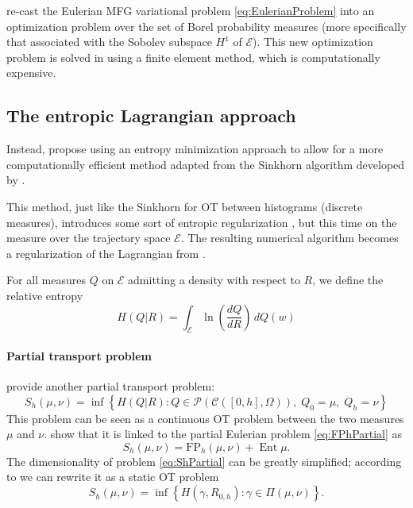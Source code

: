 \documentclass{article}
\newcommand{\calC}{\mathcal{C}}
\newcommand{\calP}{\mathcal{P}}
\DeclareMathOperator{\Ent}{Ent}
\begin{document}
    \textcite{benamou:hal-01295299,benamou2015lagrangian} re-cast the Eulerian MFG variational problem \eqref{eq:EulerianProblem} into an optimization problem over the set of Borel probability measures (more specifically that associated with the Sobolev subspace $H^1$ of $\mathscr{E}$). This new optimization problem is solved in \cite{benamou:hal-01295299} using a finite element method, which is computationally expensive.
    
    
    
    
    \subsection{The entropic Lagrangian approach}
    
    Instead, \textcite{benamou2018entropy} propose using an entropy minimization approach to allow for a more computationally efficient method adapted from the Sinkhorn algorithm \cite{cuturi2013sinkhorn} developed by \citeauthor{cuturi2013sinkhorn}.
    
    This method, just like the Sinkhorn for OT between histograms (discrete measures), introduces some sort of entropic regularization \cite{benamou2018entropy}, but this time on the measure over the trajectory space $\mathscr{E}$. The resulting numerical algorithm becomes a regularization of the Lagrangian from \cite{achdou:hal-01456506}.
    
    For all measures $Q$ on $\mathscr{E}$ admitting a density with respect to $R$, we define the relative entropy
    \begin{equation}\label{eq:VariationalEntropy}
    	H(Q | R) = \int_\mathscr{E} \ln\left(\frac{dQ}{dR}\right)\,dQ(w)
    \end{equation}
    
    \paragraph{Partial transport problem} \citeauthor{benamou2018entropy} provide another partial transport problem:
    \begin{equation}\label{eq:ShPartial}
    	S_h(\mu, \nu) =
    	\inf\left\{
    		H(Q|R) : Q\in\calP(\calC([0,h], \Omega)),
    		\; Q_0 = \mu,\; Q_h = \nu
    	\right\}
    \end{equation}
    This problem can be seen as a continuous OT problem between the two measures $\mu$ and $\nu$. \textcite{benamou2018entropy} show that it is linked to the partial Eulerian problem \eqref{eq:FPhPartial} as
    \[
    	S_h(\mu,\nu) = \mathrm{FP}_h(\mu,\nu) + \Ent \mu.
    \]
    The dimensionality of problem \eqref{eq:ShPartial} can be greatly simplified; according to \cite{benamou2018entropy} we can rewrite it as a static OT problem
    \begin{equation}
    	S_h(\mu, \nu) = \inf\left\{ H(\gamma, R_{0,h}) : \gamma \in \Pi(\mu, \nu) \right\}.
    \end{equation}
    
\end{document}
